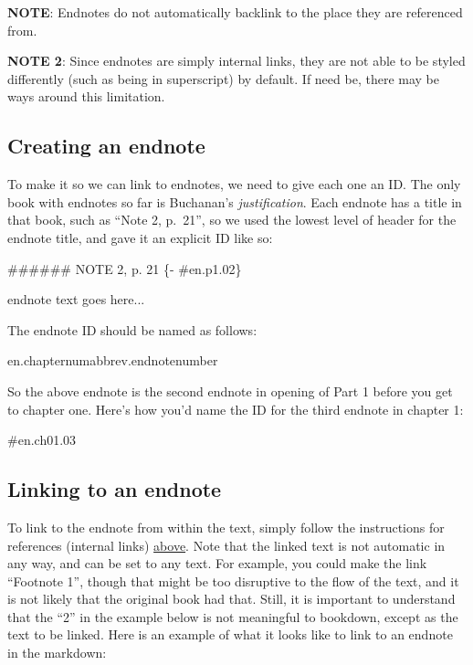 \documentclass[
]{book}
\newenvironment{Shaded}{\begin{snugshade}}{\end{snugshade}}
\newcommand{\FunctionTok}[1]{\textcolor[rgb]{0.00,0.00,0.00}{#1}}
\newcommand{\NormalTok}[1]{#1}
\begin{document}
\textbf{NOTE}: Endnotes do not automatically backlink to the place they are referenced from.

\textbf{NOTE 2}: Since endnotes are simply internal links, they are not able to be styled differently (such as being in superscript) by default. If need be, there may be ways around this limitation.

\hypertarget{creating-an-endnote}{%
\subsection{Creating an endnote}\label{creating-an-endnote}}

To make it so we can link to endnotes, we need to give each one an ID. The only book with endnotes so far is Buchanan's \emph{justification}. Each endnote has a title in that book, such as ``Note 2, p.~21'', so we used the lowest level of header for the endnote title, and gave it an explicit ID like so:

\begin{Shaded}
\begin{Highlighting}[]
\FunctionTok{\#\#\#\#\#\# NOTE 2, p. 21  \{{-} \#en.p1.02\}}

\NormalTok{endnote text goes here...}
\end{Highlighting}
\end{Shaded}

The endnote ID should be named as follows:

en.chapternumabbrev.endnotenumber

So the above endnote is the second endnote in opening of Part 1 before you get to chapter one. Here's how you'd name the ID for the third endnote in chapter 1:

\#en.ch01.03

\hypertarget{linking-to-an-endnote}{%
\subsection{Linking to an endnote}\label{linking-to-an-endnote}}

To link to the endnote from within the text, simply follow the instructions for references (internal links) \protect\hyperlink{references}{above}. Note that the linked text is not automatic in any way, and can be set to any text. For example, you could make the link ``Footnote 1'', though that might be too disruptive to the flow of the text, and it is not likely that the original book had that. Still, it is important to understand that the ``2'' in the example below is not meaningful to bookdown, except as the text to be linked. Here is an example of what it looks like to link to an endnote in the markdown:
\end{document}
